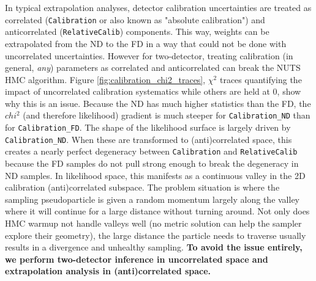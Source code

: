 \documentclass{article}
\begin{document}
In typical extrapolation analyses, detector calibration uncertainties are treated as correlated (\texttt{Calibration} or also known as "absolute calibration") and anticorrelated (\texttt{Relative\-Calib}) components. This way, weights can be extrapolated from the ND to the FD in a way that could not be done with uncorrelated uncertainties. However for two-detector, treating calibration (in general, \textit{any}) parameters as correlated and anticorrelated can break the NUTS HMC algorithm. Figure \ref{fig:calibration_chi2_traces}, $\chi^2$ traces quantifying the impact of uncorrelated calibration systematics while others are held at 0, show why this is an issue. Because the ND has much higher statistics than the FD, the $chi^2$ (and therefore likelihood) gradient is much steeper for \texttt{Calibration\_\-ND} than for \texttt{Calibration\_\-FD}. The shape of the likelihood surface is largely driven by \texttt{Calibration\_\-ND}. When these are transformed to (anti)correlated space, this creates a nearly perfect degeneracy between \texttt{Calibration} and \texttt{Relative\-Calib} because the FD samples do not pull strong enough to break the degeneracy in ND samples. In likelihood space, this manifests as a continuous valley in the 2D calibration (anti)correlated subspace. The problem situation is where the sampling pseudoparticle is given a random momentum largely along the valley where it will continue for a large distance without turning around. Not only does HMC warmup not handle valleys well (no metric solution can help the sampler explore their geometry), the large distance the particle needs to traverse usually results in a divergence and unhealthy sampling. \textbf{To avoid the issue entirely, we perform two-detector inference in uncorrelated space and extrapolation analysis in (anti)correlated space.}
\end{document}
